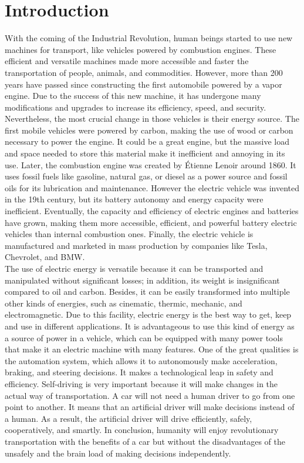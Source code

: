 \chapter{Introduction}

With the coming of the Industrial Revolution, human beings started to use new machines for transport, like vehicles powered by combustion engines. These efficient and versatile machines made more accessible and faster the transportation of people, animals, and commodities. However, more than 200 years have passed since constructing the first automobile powered by a vapor engine. Due to the success of this new machine, it has undergone many modifications and upgrades to increase its efficiency, speed, and security. Nevertheless, the most crucial change in those vehicles is their energy source. The first mobile vehicles were powered by carbon, making the use of wood or carbon necessary to power the engine. It could be a great engine, but the massive load and space needed to store this material make it inefficient and annoying in its use. Later, the combustion engine was created by Étienne Lenoir around 1860. It uses fossil fuels like gasoline, natural gas, or diesel as a power source and fossil oils for its lubrication and maintenance. However the electric vehicle was invented in the 19th century, but its battery autonomy and energy capacity were inefficient. Eventually, the capacity and efficiency of electric engines and batteries have grown, making them more accessible, efficient, and powerful battery electric vehicles than internal combustion ones. Finally, the electric vehicle is manufactured and marketed in mass production by companies like Tesla, Chevrolet, and BMW.
\\

The use of electric energy is versatile because it can be transported and manipulated without significant losses; in addition, its weight is insignificant compared to oil and carbon. Besides, it can be easily transformed into multiple other kinds of energies, such as cinematic, thermic, mechanic, and electromagnetic. Due to this facility, electric energy is the best way to get, keep and use in different applications. It is advantageous to use this kind of energy as a source of power in a vehicle, which can be equipped with many power tools that make it an electric machine with many features. One of the great qualities is the automation system, which allows it to autonomously make acceleration, braking, and steering decisions. It makes a technological leap in safety and efficiency. Self-driving is very important because it will make changes in the actual way of transportation. A car will not need a human driver to go from one point to another. It means that an artificial driver will make decisions instead of a human. As a result, the artificial driver will drive efficiently, safely, cooperatively, and smartly. In conclusion, humanity will enjoy revolutionary transportation with the benefits of a car but without the disadvantages of the unsafely and the brain load of making decisions independently.
\\

